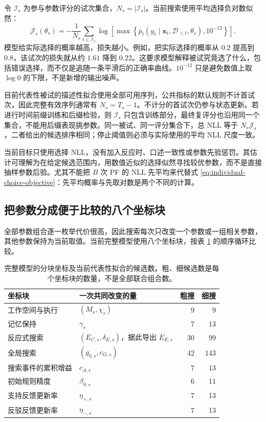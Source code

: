 \documentclass[12pt]{article}
\begin{document}
令 $\mathcal I_s$ 为参与参数评分的试次集合，$N_s=|\mathcal I_s|$。当前搜索使用平均选择负对数似然：
\begin{equation}
\mathcal J_s(\theta_s)
=-\frac{1}{N_s}\sum_{t\in\mathcal I_s}
\log\!\left[\max\!\left\{\overline p_t(y_t\mid\bm x_t,\mathcal D_{<t},\theta_s),10^{-12}\right\}\right].
\label{eq:individual-choice-objective}
\end{equation}
模型给实际选择的概率越高，损失越小。例如，把实际选择的概率从 $0.2$ 提高到 $0.8$，该试次的损失就从约 $1.61$ 降到 $0.22$。这要求模型解释被试究竟选了什么，包括错误选择，而不仅是追随一条平滑后的正确率曲线。$10^{-12}$ 只是避免数值上取 $\log 0$ 的下限，不是新增的输出噪声。

目前代表性被试的描述性拟合使用全部可用序列，公共指标的默认规则不计首试次，因此完整有效序列通常有 $N_s=T_s-1$。不计分的首试次仍参与状态更新。若进行时间前缀训练和后缀检验，则 $\mathcal I_s$ 只包含训练部分，最终复评分也沿用同一个集合，不能用后缀表现挑参数。同一被试、同一评分集合下，总 NLL 等于 $N_s\mathcal J_s$，二者给出的候选排序相同；停止阈值则必须与实际使用的平均 NLL 尺度一致。

当前目标只使用选择 NLL，没有加入反应时、口述一致性或参数先验惩罚。其估计可理解为在给定候选范围内，用数值近似的选择似然寻找较优参数，而不是直接抽样参数后验。尤其不能把 $B$ 次 PF 的 NLL 先平均来代替式 \eqref{eq:individual-choice-objective}：先平均概率与先取对数是两个不同的计算。

\subsection{把参数分成便于比较的八个坐标块}

全部参数组合逐一枚举代价很高，因此搜索每次只改变一个参数或一组相关参数，其他参数保持为当前取值。当前完整模型使用八个坐标块，按表 \ref{tab:fit-coordinate-blocks} 的顺序循环比较。

\begin{table}[htbp]
\centering
\small
\caption{完整模型的分块坐标及当前代表性拟合的候选数。粗、细候选数是每个坐标块的数量，不是全部联合组合数。}
\label{tab:fit-coordinate-blocks}
\begin{tabularx}{\textwidth}{l>{\raggedright\arraybackslash}Xrr}
\toprule
坐标块 & 一次共同改变的量 & 粗搜 & 细搜 \\
\midrule
工作空间与执行 & $(M_s,\chi_s)$ & 9 & 9 \\
记忆保持 & $\gamma_s$ & 7 & 13 \\
反应式搜索 & $(E_{C,s},\delta_{E,s})$，据此导出 $E_{E,s}$ & 30 & 99 \\
全局搜索 & $(g_{0,s},c_{G,s})$ & 42 & 143 \\
搜索事件的累积增益 & $c_{A,s}$ & 7 & 13 \\
初始规则精度 & $\beta_{0,s}$ & 6 & 11 \\
支持反馈更新率 & $\eta_{+,s}$ & 7 & 13 \\
反驳反馈更新率 & $\eta_{-,s}$ & 7 & 13 \\
\bottomrule
\end{tabularx}
\end{table}
\end{document}
